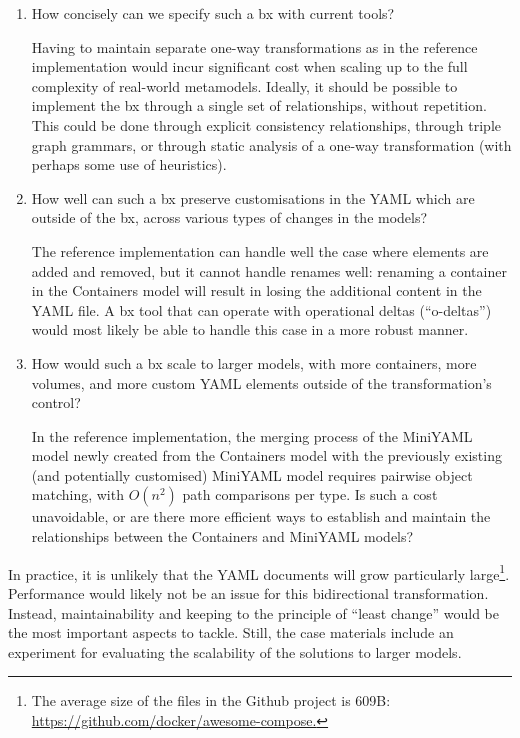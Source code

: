 \documentclass[twocolumn]{ceurart}
\begin{document}
\begin{enumerate}
\item How concisely can we specify such a bx with current tools?

  Having to maintain separate one-way transformations as in the reference
  implementation would incur significant cost when scaling up to the full
  complexity of real-world metamodels. Ideally, it should be possible to
  implement the bx through a single set of relationships, without repetition.
  This could be done through explicit consistency relationships, through triple
  graph grammars, or through static analysis of a one-way transformation (with
  perhaps some use of heuristics).

\item How well can such a bx preserve customisations in the YAML which are
  outside of the bx, across various types of changes in the models?

  The reference implementation can handle well the case where elements are added
  and removed, but it cannot handle renames well: renaming a container in the
  Containers model will result in losing the additional content in the YAML
  file. A bx tool that can operate with operational deltas (``o-deltas'') would
  most likely be able to handle this case in a more robust manner.

\item How would such a bx scale to larger models, with more containers, more
  volumes, and more custom YAML elements outside of the transformation's
  control?

  In the reference implementation, the merging process of the MiniYAML model
  newly created from the Containers model with the previously existing (and
  potentially customised) MiniYAML model requires pairwise object matching, with
  $O(n^2)$ path comparisons per type. Is such a cost unavoidable, or are there
  more efficient ways to establish and maintain the relationships between the
  Containers and MiniYAML models?
\end{enumerate}

In practice, it is unlikely that the YAML documents will grow particularly
large\footnote{The average size of the  files in the
 Github project is 609B:
\url{https://github.com/docker/awesome-compose.}}. Performance would likely not
be an issue for this bidirectional transformation. Instead, maintainability and
keeping to the principle of ``least change'' would be the most important aspects
to tackle. Still, the case materials include an experiment for evaluating the
scalability of the solutions to larger models.
\end{document}
